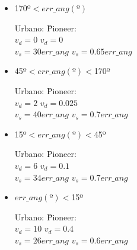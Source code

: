 \begin{itemize}

  \item 170º$<err\_ang(º)$

%
%

        \begin{tabbing}
        Urbano: \hspace{4cm} \=Pioneer:\\
        $v_{d}=0$ \> $v_{d}=0$\\
        $v_{s}=30err\_ang$ \> $v_{s}=0.65err\_ang$
        \end{tabbing}


  \item 45º$<err\_ang(º)<$170º

        \begin{tabbing}
        Urbano: \hspace{4cm} \=Pioneer:\\
        $v_{d}=2$ \> $v_{d}=0.025$\\
        $v_{s}=40err\_ang$ \> $v_{s}=0.7err\_ang$
        \end{tabbing}

  \item 15º$<err\_ang(º)<$45º

        \begin{tabbing}
        Urbano: \hspace{4cm} \=Pioneer:\\
        $v_{d}=6$ \> $v_{d}=0.1$\\
        $v_{s}=34err\_ang$ \> $v_{s}=0.7err\_ang$
        \end{tabbing}

  \item $err\_ang(º)<$15º

        \begin{tabbing}
        Urbano: \hspace{4cm} \=Pioneer:\\
        $v_{d}=10$ \> $v_{d}=0.4$\\
        $v_{s}=26err\_ang$ \> $v_{s}=0.6err\_ang$
        \end{tabbing}
\end{itemize}


